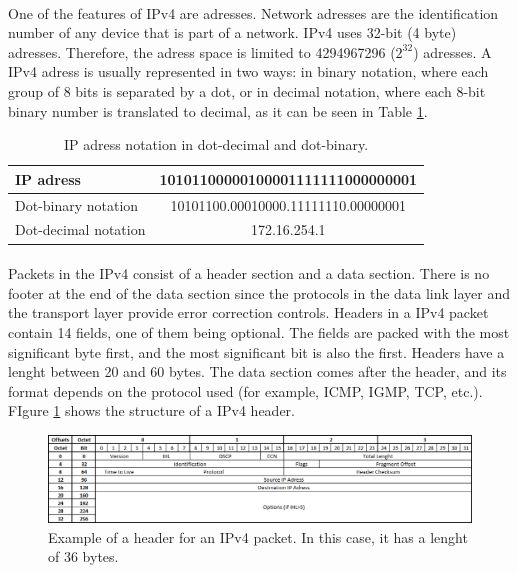 \documentclass[12pt,a4paper]{report}
\begin{document}
\paragraph{}One of the features of IPv4 are adresses. Network adresses are the identification number of any device that is part of a network. IPv4 uses 32-bit (4 byte) adresses. Therefore, the adress space is limited to 4294967296 ($2^{32}$) adresses. A IPv4 adress is usually represented in two ways: in binary notation, where each group of 8 bits is separated by a dot, or in decimal notation, where each 8-bit binary number is translated to decimal, as it can be seen in Table \ref{table:IPadress}.
\begin{table}[H]
\begin{center}
\begin{tabular}{|l|c|}
\hline 
IP adress & 10101100000100001111111000000001 \\ 
\hline 
Dot-binary notation & 10101100.00010000.11111110.00000001 \\ 
\hline 
Dot-decimal notation & 172.16.254.1 \\ 
\hline
\end{tabular}
\end{center}
\caption[IP adress notation]{IP adress notation in dot-decimal and dot-binary.}
\label{table:IPadress}
\end{table}
\paragraph{}Packets in the IPv4 consist of a header section and a data section. There is no footer at the end of the data section since the protocols in the data link layer and the transport layer provide error correction controls. Headers in a IPv4 packet contain 14 fields, one of them being optional. The fields are packed with the most significant byte first, and the most significant bit is also the first. Headers have a lenght between 20 and 60 bytes. The data section comes after the header, and its format depends on the protocol used (for example, ICMP, IGMP, TCP, etc.). FIgure \ref{fig:IPv4header} shows the structure of a IPv4 header.
\begin{figure}[H]
\begin{center}
\includegraphics[scale=0.6]{IPv4_header.PNG}
\caption[IPv4 header]{Example of a header for an IPv4 packet. In this case, it has a lenght of 36 bytes.}
\label{fig:IPv4header}
\end{center}
\end{figure}
\end{document}
